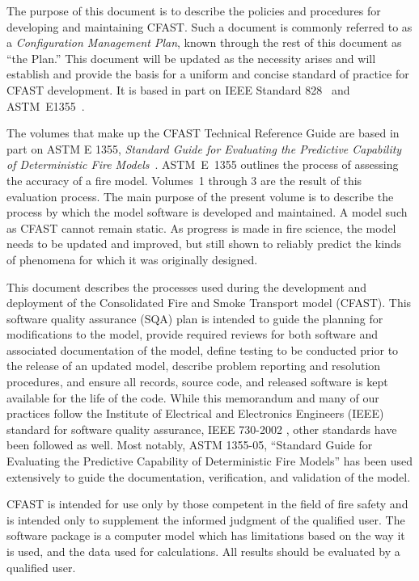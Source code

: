 \documentclass[12pt]{book}
\begin{document}
The purpose of this document is to describe the policies and procedures for developing and maintaining CFAST. Such a document is commonly referred to as a {\em Configuration Management Plan}, known through the rest of this document as ``the Plan.'' This document will be updated as the necessity arises and will establish and provide the basis for a uniform and concise standard of practice for CFAST development. It is based in part on IEEE Standard 828~\cite{IEEE-828} and ASTM~E1355~\cite{ASTM:E1355}.

The volumes that make up the CFAST Technical Reference Guide are based in part on ASTM E 1355, {\em Standard Guide for Evaluating the Predictive Capability of Deterministic Fire Models}~\cite{ASTM:E1355}. ASTM~E~1355 outlines the process of assessing the accuracy of a fire model. Volumes~1 through 3 are the result of this evaluation process. The main purpose of the present volume is to describe the process by which the model software is developed and maintained. A model such as CFAST cannot remain static. As progress is made in fire science, the model needs to be updated and improved, but still shown to reliably predict the kinds of
phenomena for which it was originally designed.

This document describes the processes used during the development and deployment of the Consolidated Fire and Smoke Transport model (CFAST).  This software quality assurance (SQA) plan is intended to guide the planning for modifications to the model, provide required reviews for both software and associated documentation of the model, define testing to be conducted prior to the release of an updated model, describe problem reporting and resolution procedures, and ensure all records, source code, and released software is kept available for the life of the code.  While this memorandum and many of our practices follow the Institute of Electrical and Electronics Engineers (IEEE) standard for software quality assurance, IEEE 730-2002 \cite{IEEE:730}, other standards have been followed as well.  Most notably, ASTM 1355-05, ``Standard Guide for Evaluating the Predictive Capability of Deterministic Fire Models'' \cite{ASTM:E1355} has been used extensively to guide the documentation, verification, and validation of the model.

CFAST is intended for use only by those competent in the field of fire safety and is intended only to supplement the informed judgment of the qualified user. The software package is a computer model which has limitations based on the way it is used, and the data used for calculations. All results should be evaluated by a qualified user.
\end{document}
